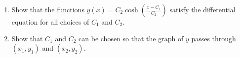 \documentclass{article}
\begin{document}
\begin{enumerate}
\begin{enumerate}
\begin{proof}
                              If $y(x)$ is an extremal, then there exists some
                              $f(x,y,y')$ such that
                              \[
                                    \int_{x_1}^{x_2} f(x,y(x),y'(x))dx
                              \]
                              has a local maximum or minimum at $y(x)$. Then,
                              by the Euler-Lagrange equation,
                              \[
                                    f_y(x,y,y') - \frac{d}{dx}f_{y'}(x,y,y')=0.
                              \]
                        \end{proof}
                  \item Show that the functions $y(x)=C_2\cosh
                              (\frac{x-C_1}{C_2})$ satisfy the differential
                        equation for all choices of $C_1$ and $C_2$.
                  \item Show that $C_1$ and $C_2$ can be chosen so that the
                        graph of $y$ passes through $(x_1, y_1)$ and
                        $(x_2, y_2)$.
            \end{enumerate}
\end{enumerate}
\end{document}
